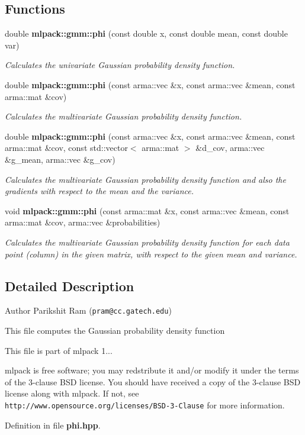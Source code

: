 \subsection*{Functions}
\begin{DoxyCompactItemize}
\item 
double {\bf mlpack\-::gmm\-::phi} (const double x, const double mean, const double var)
\begin{DoxyCompactList}\small\item\em Calculates the univariate Gaussian probability density function. \end{DoxyCompactList}\item 
double {\bf mlpack\-::gmm\-::phi} (const arma\-::vec \&x, const arma\-::vec \&mean, const arma\-::mat \&cov)
\begin{DoxyCompactList}\small\item\em Calculates the multivariate Gaussian probability density function. \end{DoxyCompactList}\item 
double {\bf mlpack\-::gmm\-::phi} (const arma\-::vec \&x, const arma\-::vec \&mean, const arma\-::mat \&cov, const std\-::vector$<$ arma\-::mat $>$ \&d\-\_\-cov, arma\-::vec \&g\-\_\-mean, arma\-::vec \&g\-\_\-cov)
\begin{DoxyCompactList}\small\item\em Calculates the multivariate Gaussian probability density function and also the gradients with respect to the mean and the variance. \end{DoxyCompactList}\item 
void {\bf mlpack\-::gmm\-::phi} (const arma\-::mat \&x, const arma\-::vec \&mean, const arma\-::mat \&cov, arma\-::vec \&probabilities)
\begin{DoxyCompactList}\small\item\em Calculates the multivariate Gaussian probability density function for each data point (column) in the given matrix, with respect to the given mean and variance. \end{DoxyCompactList}\end{DoxyCompactItemize}


\subsection{Detailed Description}
\begin{DoxyAuthor}{Author}
Parikshit Ram ({\tt pram@cc.\-gatech.\-edu})
\end{DoxyAuthor}
This file computes the Gaussian probability density function

This file is part of mlpack 1...

mlpack is free software; you may redstribute it and/or modify it under the terms of the 3-\/clause B\-S\-D license. You should have received a copy of the 3-\/clause B\-S\-D license along with mlpack. If not, see {\tt http\-://www.\-opensource.\-org/licenses/\-B\-S\-D-\/3-\/\-Clause} for more information. 

Definition in file {\bf phi.\-hpp}.


